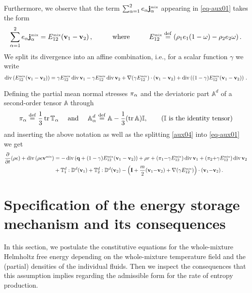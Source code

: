 \documentclass[a4paper]{article}
\begin{document}
Furthermore, we observe that the term $\sum_{\alpha=1}^2 e_\alpha{\bf j}^{\mbox{\tiny{mix}}}_\alpha$ appearing in \eqref{eq-aux01} takes the form
\begin{align}\label{aux03}
\sum_{\alpha=1}^2 e_\alpha{\bf j}^{\mbox{\tiny{mix}}}_\alpha = E_{12}^{\mbox{\tiny{mix}}}({\bf v}_1-{\bf v}_2)\,,\hspace{1cm}\text{where}\hspace{1cm}E_{12}^{\mbox{\tiny{mix}}}\stackrel{\mathrm{def}}{=} (\rho_1 e_1 (1-\omega) - \rho_2 e_2\omega)\,.
\end{align}
We split its divergence into an affine combination, i.e., for a scalar function $\gamma$ we write %
\begin{align}\label{aux04}
\mathop{\rm div}\nolimits \left( E_{12}^{\mbox{\tiny{mix}}}({\bf v}_1-{\bf v}_2)\right) = \gamma E_{12}^{\mbox{\tiny{mix}}} \mathop{\rm div}\nolimits{\bf v}_1 - \gamma E_{12}^{\mbox{\tiny{mix}}} \mathop{\rm div}\nolimits{\bf v}_2 + \nabla (\gamma E_{12}^{\mbox{\tiny{mix}}}) \cdot ({\bf v}_1 - {\bf v}_2) + \mathop{\rm div}\nolimits \left( (1-\gamma) E_{12}^{\mbox{\tiny{mix}}}({\bf v}_1-{\bf v}_2)\right)\,. 
\end{align}


Defining the partial mean normal stresses $\pi_\alpha$ and the deviatoric part $\mathbb{A}^d$ of a second-order tensor $\mathbb{A}$ through
\begin{align}
    \pi_\alpha \stackrel{\mathrm{def}}{=} \frac13 \mathop{\rm tr}\nolimits \mathbb{T}_\alpha \quad \textrm{ and } \quad \mathbb{A}_\alpha^d \stackrel{\mathrm{def}}{=} \mathbb{A} - \frac13 (\mathop{\rm tr}\nolimits \mathbb{A}) \mathbb{I}, \qquad (\mathbb{I} \textrm{ is the identity tensor})
\end{align}
and inserting the above notation as well as the splitting \eqref{aux04} into \eqref{eq-aux01} we get 
\begin{equation}
\label{eq-internal-e-barycentric}
\begin{split}
  \frac{\partial}{\partial t}(\rho e) + \mathop{\rm div}\nolimits\left(\rho e{\bf v}^{\mbox{\tiny{mix}}}\right) &= -\mathop{\rm div}\nolimits \left( {\bf{q}} + (1-\gamma) E_{12}^{\mbox{\tiny{mix}}}({\bf v}_1-{\bf v}_2)\right) +\rho r + (\pi_1{-}\gamma E_{12}^{\mbox{\tiny{mix}}})\mathop{\rm div}\nolimits{\bf v}_1 + (\pi_2{+}\gamma E_{12}^{\mbox{\tiny{mix}}})\mathop{\rm div}\nolimits{\bf v}_2 \\ & + \mathbb{T}^d_1:\mathbb{D}^d({\bf v}_1) + \mathbb{T}^d_2:\mathbb{D}^d({\bf v}_2)- \left({\mathbf{I}} + \frac{m}{2}({\bf v}_1{-}{\bf v}_2) + \nabla(\gamma E_{12}^{\mbox{\tiny{mix}}})\right)\cdot({\bf v}_1{-}{\bf v}_2)\,.
\end{split}
\end{equation}

\section{Specification of the energy storage mechanism and its consequences} \label{sec:4}
In this section, we postulate the constitutive equations for the whole-mixture Helmholtz free energy depending on the whole-mixture temperature field and the (partial) densities of the individual fluids. Then we inspect the consequences that this assumption implies regarding the admissible form for the rate of entropy production.
\end{document}
